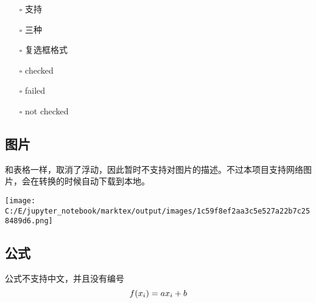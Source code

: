 \documentclass[UTF8]{ctexart}
\newenvironment{marktext}{}{}
\begin{document}
\begin{itemize}
\item[\rlap{\raisebox{0.3ex}{\hspace{0.4ex}\tiny \ding{52}}}$\square$]
支持
\item[\rlap{\raisebox{0.3ex}{\hspace{0.4ex}\scriptsize \ding{56}}}$\square$]
三种
\item[$\square$]
复选框格式
\end{itemize}
\begin{marktext}


\begin{itemize}
\item[\rlap{\raisebox{0.3ex}{\hspace{0.4ex}\tiny \ding{52}}}$\square$] checked
\item[\rlap{\raisebox{0.3ex}{\hspace{0.4ex}\scriptsize \ding{56}}}$\square$] failed
\item[$\square$] not checked
\end{itemize}

\subsection{图片}


和表格一样，取消了浮动，因此暂时不支持对图片的描述。不过本项目支持网络图片，会在转换的时候自动下载到本地。


\begin{center}
\begin{marktext}
\vspace{\baselineskip}\texttt{[image: C:/E/jupyter\_notebook/marktex/output/images/1c59f8ef2aa3c5e527a22b7c258489d6.png]}\vspace{\baselineskip}
\end{marktext}
\end{center}


\subsection{公式}


公式不支持中文，并且没有编号
\end{marktext}
\[
\\ f(x_i)=ax_i+b\\ \\
\]
\end{document}
